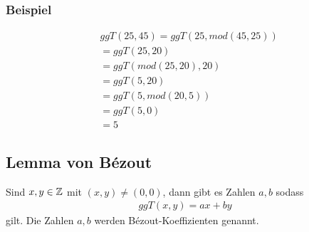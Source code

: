 \subsubsection{Beispiel}
\begin{align*}
	 & ggT (25, 45) = ggT (25, mod(45, 25)) \\
	 & = ggT (25, 20)                       \\
	 & = ggT (mod(25, 20), 20)              \\
	 & = ggT (5, 20)                        \\
	 & = ggT (5, mod(20, 5))                \\
	 & = ggT (5, 0)                         \\
	 & = 5
\end{align*}
\subsection{Lemma von Bézout}
Sind $x,y \in \mathbb{Z}$ mit $(x,y) \neq (0,0)$, dann gibt es Zahlen $a,b$ sodass
\begin{align*}
	ggT(x,y) = ax + by
\end{align*}
gilt. Die Zahlen $a,b$ werden Bézout-Koeffizienten genannt.
